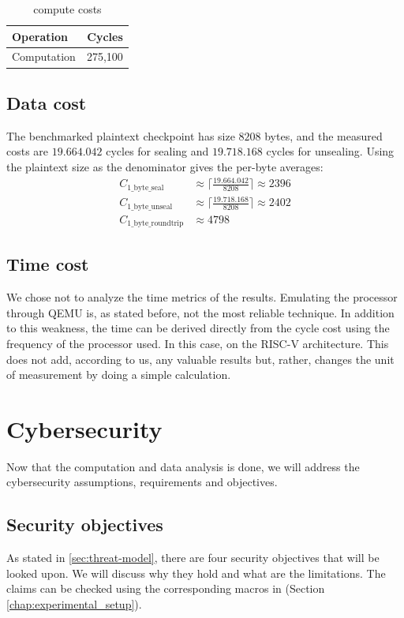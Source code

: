 \documentclass[11pt,a4paper]{report}
\begin{document}
\begin{table}[H]
    \centering
    \label{tab:cpmpute_cycle_costs}
    \begin{tabular}{|l|r|}
        \hline
        Operation & Cycles \\
        \hline
        Computation & 275,100 \\
        \hline
    \end{tabular}
    \caption{compute costs}
\end{table}

\subsection{Data cost}
\label{sub:data-cost}

The benchmarked plaintext checkpoint has size $8208$ bytes, and the measured costs are $19.664.042$ cycles for sealing and $19.718.168$ cycles for unsealing. 
Using the plaintext size as the denominator gives the per-byte averages:
\begin{align}
    C_{\text{1\_byte\_seal}} &\approx \lceil\frac{19.664.042}{8208}\rceil \approx 2396 \\
    C_{\text{1\_byte\_unseal}} &\approx \lceil\frac{19.718.168}{8208}\rceil \approx 2402 \\
    C_{\text{1\_byte\_roundtrip}} &\approx 4798
\end{align}

\subsection*{Time cost}
We chose not to analyze the time metrics of the results. 
Emulating the processor through QEMU is, as stated before, not the most reliable technique.
In addition to this weakness, the time can be derived directly from the cycle cost using the frequency of the processor used. 
In this case, on the RISC-V architecture.
This does not add, according to us, any valuable results but, rather, changes the unit of measurement by doing a simple calculation.

\section{Cybersecurity}
Now that the computation and data analysis is done, we will address the cybersecurity assumptions, requirements and objectives.

\subsection{Security objectives}
As stated in \ref{sec:threat-model}, there are four security objectives that will be looked upon.
We will discuss why they hold and what are the limitations.
The claims can be checked using the corresponding macros in (Section \ref{chap:experimental_setup}).
\end{document}
